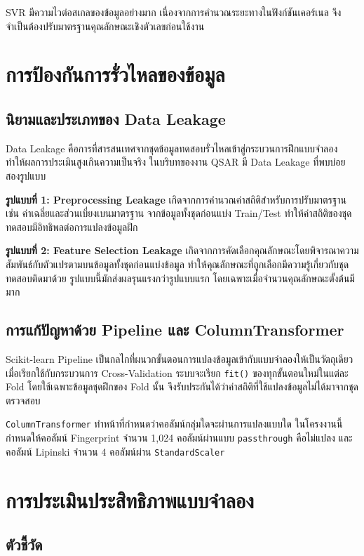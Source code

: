 SVR มีความไวต่อสเกลของข้อมูลอย่างมาก เนื่องจากการคำนวณระยะทางในฟังก์ชันเคอร์เนล จึงจำเป็นต้องปรับมาตรฐานคุณลักษณะเชิงตัวเลขก่อนใช้งาน

\section{การป้องกันการรั่วไหลของข้อมูล}

\subsection{นิยามและประเภทของ Data Leakage}

Data Leakage คือการที่สารสนเทศจากชุดข้อมูลทดสอบรั่วไหลเข้าสู่กระบวนการฝึกแบบจำลอง ทำให้ผลการประเมินสูงเกินความเป็นจริง ในบริบทของงาน QSAR มี Data Leakage ที่พบบ่อยสองรูปแบบ

\textbf{รูปแบบที่ 1: Preprocessing Leakage} เกิดจากการคำนวณค่าสถิติสำหรับการปรับมาตรฐาน เช่น ค่าเฉลี่ยและส่วนเบี่ยงเบนมาตรฐาน จากข้อมูลทั้งชุดก่อนแบ่ง Train/Test ทำให้ค่าสถิติของชุดทดสอบมีอิทธิพลต่อการแปลงข้อมูลฝึก

\textbf{รูปแบบที่ 2: Feature Selection Leakage} เกิดจากการคัดเลือกคุณลักษณะโดยพิจารณาความสัมพันธ์กับตัวแปรตามบนข้อมูลทั้งชุดก่อนแบ่งข้อมูล ทำให้คุณลักษณะที่ถูกเลือกมีความรู้เกี่ยวกับชุดทดสอบติดมาด้วย รูปแบบนี้มักส่งผลรุนแรงกว่ารูปแบบแรก โดยเฉพาะเมื่อจำนวนคุณลักษณะตั้งต้นมีมาก

\subsection{การแก้ปัญหาด้วย Pipeline และ ColumnTransformer}

Scikit-learn Pipeline เป็นกลไกที่ผนวกขั้นตอนการแปลงข้อมูลเข้ากับแบบจำลองให้เป็นวัตถุเดียว เมื่อเรียกใช้กับกระบวนการ Cross-Validation ระบบจะเรียก \texttt{fit()} ของทุกขั้นตอนใหม่ในแต่ละ Fold โดยใช้เฉพาะข้อมูลชุดฝึกของ Fold นั้น จึงรับประกันได้ว่าค่าสถิติที่ใช้แปลงข้อมูลไม่ได้มาจากชุดตรวจสอบ

\texttt{ColumnTransformer} ทำหน้าที่กำหนดว่าคอลัมน์กลุ่มใดจะผ่านการแปลงแบบใด ในโครงงานนี้กำหนดให้คอลัมน์ Fingerprint จำนวน 1{,}024 คอลัมน์ผ่านแบบ \texttt{passthrough} คือไม่แปลง และคอลัมน์ Lipinski จำนวน 4 คอลัมน์ผ่าน \texttt{StandardScaler}

\section{การประเมินประสิทธิภาพแบบจำลอง}

\subsection{ตัวชี้วัด}

